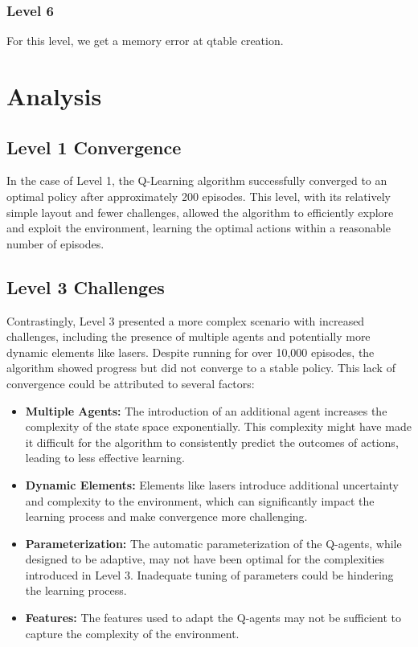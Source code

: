\documentclass{article}
\begin{document}
\subsubsection{Level 6}
For this level, we get a memory error at qtable creation.

\section{Analysis}
\subsection{Level 1 Convergence}
In the case of Level 1, the Q-Learning algorithm successfully converged to an optimal policy after approximately 200 episodes. This level, with its relatively simple layout and fewer challenges, allowed the algorithm to efficiently explore and exploit the environment, learning the optimal actions within a reasonable number of episodes.

\subsection{Level 3 Challenges}
Contrastingly, Level 3 presented a more complex scenario with 
increased challenges, including the presence of multiple agents and potentially
 more dynamic elements like lasers. 
 Despite running for over 10,000 episodes, 
 the algorithm showed progress but did not converge to a stable policy.
  This lack of convergence could be attributed to several factors:

\begin{itemize}
    \item \textbf{Multiple Agents:} The introduction of an additional agent increases the complexity of the state space exponentially. This complexity might have made it difficult for the algorithm to consistently predict the outcomes of actions, leading to less effective learning.
    \item \textbf{Dynamic Elements:} Elements like lasers introduce additional uncertainty and complexity to the environment, which can significantly impact the learning process and make convergence more challenging.
    \item \textbf{Parameterization:} The automatic parameterization
     of the Q-agents, while designed to be adaptive, may not have been optimal
      for the complexities introduced in Level 3. 
      Inadequate tuning of parameters could be hindering the learning process.
    \item \textbf{Features:} The features used to adapt the Q-agents may not be 
    sufficient to capture the complexity of the environment.
    \end{itemize}
\end{document}
